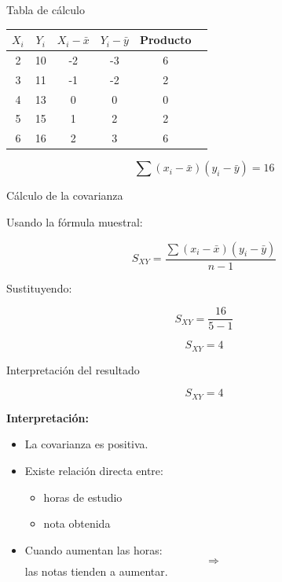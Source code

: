 \documentclass{beamer}
\begin{document}
\begin{frame}{Tabla de cálculo}

\small

\begin{center}
\begin{tabular}{cccccc}
\toprule
\(X_i\) & \(Y_i\) &
\(X_i-\bar{x}\) &
\(Y_i-\bar{y}\) &
Producto \\
\midrule

2 & 10 & -2 & -3 & 6 \\
3 & 11 & -1 & -2 & 2 \\
4 & 13 & 0 & 0 & 0 \\
5 & 15 & 1 & 2 & 2 \\
6 & 16 & 2 & 3 & 6 \\

\bottomrule
\end{tabular}
\end{center}

\vspace{0.3cm}

\[
\sum (x_i-\bar{x})(y_i-\bar{y}) = 16
\]

\end{frame}

\begin{frame}{Cálculo de la covarianza}

Usando la fórmula muestral:

\[
S_{XY}
=
\frac{\sum (x_i-\bar{x})(y_i-\bar{y})}{n-1}
\]

\vspace{0.4cm}

Sustituyendo:

\[
S_{XY}
=
\frac{16}{5-1}
\]

\[
S_{XY}=4
\]

\end{frame}

\begin{frame}{Interpretación del resultado}

\[
S_{XY}=4
\]

\vspace{0.4cm}

\textbf{Interpretación:}

\begin{itemize}
\item La covarianza es positiva.
\item Existe relación directa entre:
\begin{itemize}
\item horas de estudio
\item nota obtenida
\end{itemize}

\item Cuando aumentan las horas:
\[
\Rightarrow
\]
las notas tienden a aumentar.
\end{itemize}

\end{frame}
\end{document}
